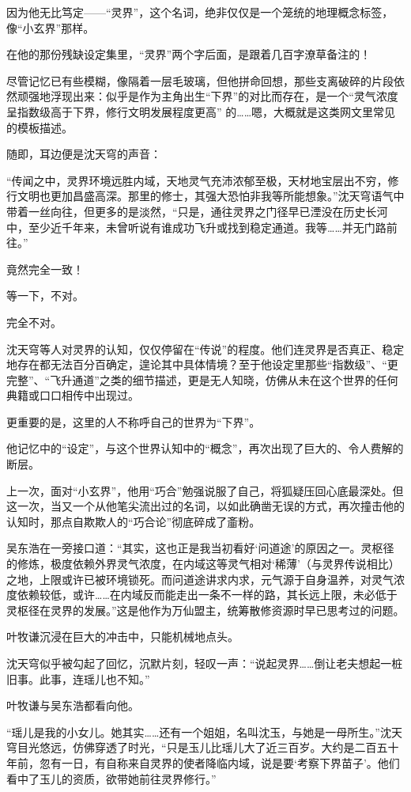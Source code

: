 因为他无比笃定——“灵界”，这个名词，绝非仅仅是一个笼统的地理概念标签，像“小玄界”那样。

在他的那份残缺设定集里，“灵界”两个字后面，是跟着几百字潦草备注的！

尽管记忆已有些模糊，像隔着一层毛玻璃，但他拼命回想，那些支离破碎的片段依然顽强地浮现出来：似乎是作为主角出生“下界”的对比而存在，是一个“灵气浓度呈指数级高于下界，修行文明发展程度更高” 的……嗯，大概就是这类网文里常见的模板描述。

随即，耳边便是沈天穹的声音：

“传闻之中，灵界环境远胜内域，天地灵气充沛浓郁至极，天材地宝层出不穷，修行文明也更加昌盛高深。那里的修士，其强大恐怕非我等所能想象。”沈天穹语气中带着一丝向往，但更多的是淡然，“只是，通往灵界之门径早已湮没在历史长河中，至少近千年来，未曾听说有谁成功飞升或找到稳定通道。我等……并无门路前往。”

竟然完全一致！

等一下，不对。

完全不对。

沈天穹等人对灵界的认知，仅仅停留在“传说”的程度。他们连灵界是否真正、稳定地存在都无法百分百确定，遑论其中具体情境？至于他设定里那些“指数级”、“更完整”、“飞升通道”之类的细节描述，更是无人知晓，仿佛从未在这个世界的任何典籍或口口相传中出现过。

更重要的是，这里的人不称呼自己的世界为“下界”。

他记忆中的“设定”，与这个世界认知中的“概念”，再次出现了巨大的、令人费解的断层。

上一次，面对“小玄界”，他用“巧合”勉强说服了自己，将狐疑压回心底最深处。但这一次，当又一个从他笔尖流出过的名词，以如此确凿无误的方式，再次撞击他的认知时，那点自欺欺人的“巧合论”彻底碎成了齑粉。

吴东浩在一旁接口道：“其实，这也正是我当初看好‘问道途’的原因之一。灵枢径的修炼，极度依赖外界灵气浓度，在内域这等灵气相对‘稀薄’（与灵界传说相比）之地，上限或许已被环境锁死。而问道途讲求内求，元气源于自身温养，对灵气浓度依赖较低，或许……在内域反而能走出一条不一样的路，其长远上限，未必低于灵枢径在灵界的发展。”这是他作为万仙盟主，统筹散修资源时早已思考过的问题。

叶牧谦沉浸在巨大的冲击中，只能机械地点头。

沈天穹似乎被勾起了回忆，沉默片刻，轻叹一声：“说起灵界……倒让老夫想起一桩旧事。此事，连瑶儿也不知。”

叶牧谦与吴东浩都看向他。

“瑶儿是我的小女儿。她其实……还有一个姐姐，名叫沈玉，与她是一母所生。”沈天穹目光悠远，仿佛穿透了时光，“只是玉儿比瑶儿大了近三百岁。大约是二百五十年前，忽有一日，有自称来自灵界的使者降临内域，说是要‘考察下界苗子’。他们看中了玉儿的资质，欲带她前往灵界修行。”

